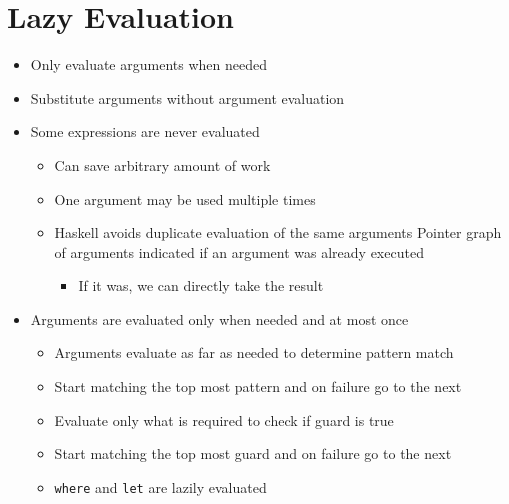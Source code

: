 
\section{Lazy Evaluation}
\begin{itemize}
    \item Only evaluate arguments when needed
    \item Substitute arguments without argument evaluation
    \item Some expressions are never evaluated
        \begin{itemize}
            \item Can save arbitrary amount of work
        \end{itemize}
        \begin{itemize}
            \item One argument may be used multiple times
            \item Haskell avoids duplicate evaluation of the same arguments
             Pointer graph of arguments indicated if an argument was already executed
                \begin{itemize}
                    \item If it was, we can directly take the result
                \end{itemize}
        \end{itemize}
    \item Arguments are evaluated only when needed and at most once
        \begin{itemize}
            \item Arguments evaluate as far as needed to determine pattern match
            \item Start matching the top most pattern and on failure go to the next
        \end{itemize}
        \begin{itemize}
            \item Evaluate only what is required to check if guard is true
            \item Start matching the top most guard and on failure go to the next
        \end{itemize}
        \begin{itemize}
            \item \verb+where+ and \verb+let+ are lazily evaluated

\end{itemize}
\end{itemize}
